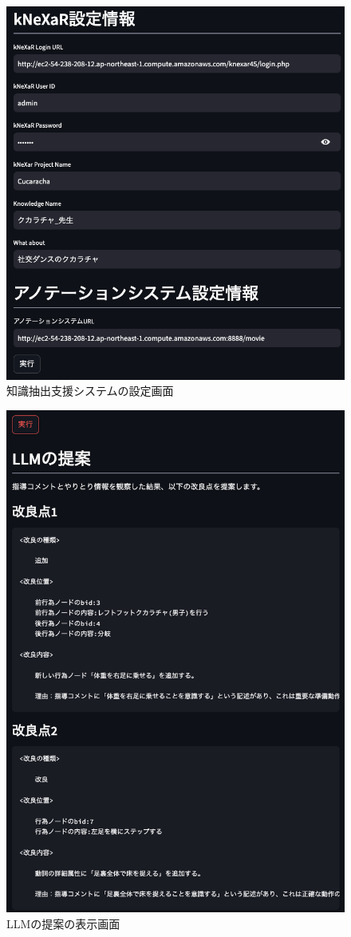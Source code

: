 \begin{figure}[htbp]
    \centering
    \includegraphics[width=0.9\linewidth]{./image/k3s_settings.png}
    \caption{知識抽出支援システムの設定画面}
    \label{fig18}
\end{figure}

\begin{figure}[htbp]
    \centering
    \includegraphics[width=0.9\linewidth]{./image/k3s_feedback.png}
    \caption{LLMの提案の表示画面}
    \label{fig19}
\end{figure}


